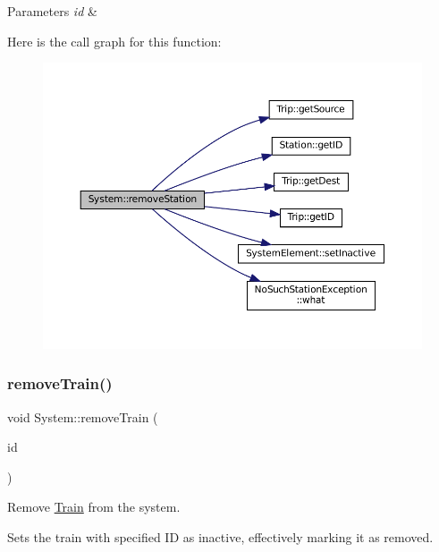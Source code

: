 \begin{DoxyParams}{Parameters}
{\em id} & \\
\hline
\end{DoxyParams}
Here is the call graph for this function\+:
\nopagebreak
\begin{figure}[H]
\begin{center}
\leavevmode
\includegraphics[width=350pt]{classSystem_afb7a703741077530b0dd299872f7892f_cgraph}
\end{center}
\end{figure}
\mbox{\label{classSystem_ab36039b5b1cffc88356398bac8b4f79b}} 
\subsubsection{\texorpdfstring{remove\+Train()}{removeTrain()}}
{\footnotesize\ttfamily void System\+::remove\+Train (\begin{DoxyParamCaption}\item[{\mbox{\hyperlink{project__utils_8h_a8f3a969054ad2200720b96e7e23dd4e1}{id\+\_\+t}}}]{id }\end{DoxyParamCaption})}



Remove \mbox{\hyperlink{classTrain}{Train}} from the system. 

Sets the train with specified ID as inactive, effectively marking it as removed.


